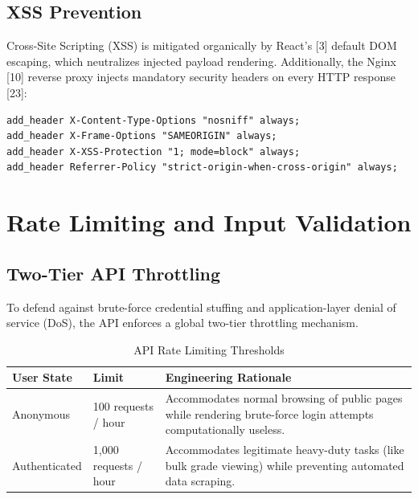 \subsection{XSS Prevention}

Cross-Site Scripting (XSS) is mitigated organically by React's [3] default DOM escaping, which neutralizes injected payload rendering. Additionally, the Nginx [10] reverse proxy injects mandatory security headers on every HTTP response [23]:

\begin{lstlisting}[float, language=nginx, caption=Mandatory Security Headers (\texttt{nginx.conf})]
add_header X-Content-Type-Options "nosniff" always;
add_header X-Frame-Options "SAMEORIGIN" always;
add_header X-XSS-Protection "1; mode=block" always;
add_header Referrer-Policy "strict-origin-when-cross-origin" always;
\end{lstlisting}

\section{Rate Limiting and Input Validation}
\label{sec:rate-limiting}

\subsection{Two-Tier API Throttling}

To defend against brute-force credential stuffing and application-layer denial of service (DoS), the API enforces a global two-tier throttling mechanism. 

\begin{table}[H]
    \centering
    \renewcommand{\arraystretch}{1.3}
    \begin{tabular}{|p{}|p{}|p{}|}
        \hline
        \textbf{User State} & \textbf{Limit} & \textbf{Engineering Rationale} \\
        \hline
        Anonymous & 100 requests / hour & Accommodates normal browsing of public pages while rendering brute-force login attempts computationally useless. \\
        \hline
        Authenticated & 1,000 requests / hour & Accommodates legitimate heavy-duty tasks (like bulk grade viewing) while preventing automated data scraping. \\
        \hline
    \end{tabular}
    \caption{API Rate Limiting Thresholds}
    \label{tab:rate_limits}
\end{table}

